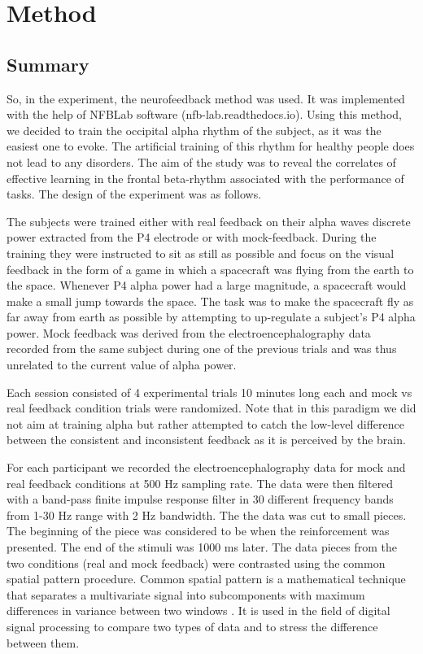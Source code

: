 \documentclass[14pt,a4paper]{scrartcl}
\begin{document}
\newpage
\section{Method}
\label{sec:Method}  

\subsection{Summary}
\label{sec:Methods:Summary}

So, in the experiment, the neurofeedback method was used. It was implemented with the help of NFBLab software (nfb-lab.readthedocs.io). Using this method, we decided to train the occipital alpha rhythm of the subject, as it was the easiest one to evoke. The artificial training of this rhythm for healthy people does not lead to any disorders. The aim of the study was to reveal the correlates of effective learning in the frontal beta-rhythm associated with the performance of tasks. The design of the experiment was as follows.

The subjects were trained either with real feedback on their alpha waves discrete power extracted from the P4 electrode or with mock-feedback. During the training they were instructed to sit as still as possible and focus on the visual feedback in the form of a game in which a spacecraft was flying from the earth to the space. Whenever P4 alpha power had a large magnitude, a spacecraft would make a small jump towards the space. The task was to make the spacecraft fly as far away from earth as possible by attempting to up-regulate a subject’s P4 alpha power. Mock feedback was derived from the electroencephalography data recorded from the same subject during one of the previous trials and was thus unrelated to the current value of alpha power.

Each session consisted of 4 experimental trials 10 minutes long each and mock vs real feedback condition trials were randomized.  Note that in this paradigm we did not aim at training alpha but rather attempted to catch the low-level difference between the consistent and inconsistent feedback as it is perceived by the brain.

For each participant we recorded the electroencephalography data for mock and real feedback conditions at 500 Hz sampling rate. The data were then filtered with a band-pass finite impulse response filter in 30 different frequency bands from 1-30 Hz range with 2 Hz bandwidth. The the data was cut to small pieces. The beginning of the piece was considered to be when the reinforcement was presented. The end of the stimuli was 1000 ms later. The data pieces from the two conditions (real and mock feedback) were contrasted using the common spatial pattern procedure. Common spatial pattern is a mathematical technique that separates a multivariate signal into subcomponents with maximum differences in variance between two windows \cite{Koles1990}. It is used in the field of digital signal processing to compare two types of data and to stress the difference between them.
\end{document}
